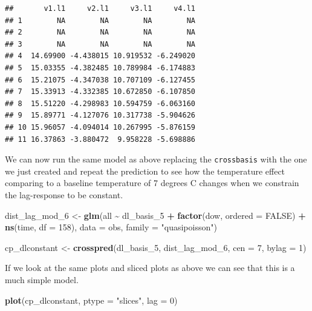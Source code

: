 \documentclass[
]{book}
\newenvironment{Shaded}{\begin{snugshade}}{\end{snugshade}}
\newcommand{\AttributeTok}[1]{\textcolor[rgb]{0.13,0.29,0.53}{#1}}
\newcommand{\ConstantTok}[1]{\textcolor[rgb]{0.56,0.35,0.01}{#1}}
\newcommand{\DecValTok}[1]{\textcolor[rgb]{0.00,0.00,0.81}{#1}}
\newcommand{\FunctionTok}[1]{\textcolor[rgb]{0.13,0.29,0.53}{\textbf{#1}}}
\newcommand{\NormalTok}[1]{#1}
\newcommand{\OtherTok}[1]{\textcolor[rgb]{0.56,0.35,0.01}{#1}}
\newcommand{\SpecialCharTok}[1]{\textcolor[rgb]{0.81,0.36,0.00}{\textbf{#1}}}
\newcommand{\StringTok}[1]{\textcolor[rgb]{0.31,0.60,0.02}{#1}}
\begin{document}
\begin{verbatim}
##       v1.l1     v2.l1     v3.l1     v4.l1
## 1        NA        NA        NA        NA
## 2        NA        NA        NA        NA
## 3        NA        NA        NA        NA
## 4  14.69900 -4.438015 10.919532 -6.249020
## 5  15.03355 -4.382485 10.789984 -6.174883
## 6  15.21075 -4.347038 10.707109 -6.127455
## 7  15.33913 -4.332385 10.672850 -6.107850
## 8  15.51220 -4.298983 10.594759 -6.063160
## 9  15.89771 -4.127076 10.317738 -5.904626
## 10 15.96057 -4.094014 10.267995 -5.876159
## 11 16.37863 -3.880472  9.958228 -5.698886
\end{verbatim}

We can now run the same model as above replacing the \texttt{crossbasis} with the one we just created and
repeat the prediction to see how the temperature effect comparing to a baseline temperature
of 7 degrees C changes when we constrain the lag-response to be constant.

\begin{Shaded}
\begin{Highlighting}[]
\NormalTok{dist\_lag\_mod\_6 }\OtherTok{\textless{}{-}} \FunctionTok{glm}\NormalTok{(all }\SpecialCharTok{\textasciitilde{}}\NormalTok{ dl\_basis\_5 }\SpecialCharTok{+} 
                        \FunctionTok{factor}\NormalTok{(dow, }\AttributeTok{ordered =} \ConstantTok{FALSE}\NormalTok{) }\SpecialCharTok{+}
                          \FunctionTok{ns}\NormalTok{(time, }\AttributeTok{df =} \DecValTok{158}\NormalTok{), }
                        \AttributeTok{data =}\NormalTok{ obs, }\AttributeTok{family =} \StringTok{"quasipoisson"}\NormalTok{)}

\NormalTok{cp\_dlconstant }\OtherTok{\textless{}{-}} \FunctionTok{crosspred}\NormalTok{(dl\_basis\_5, dist\_lag\_mod\_6, }\AttributeTok{cen =} \DecValTok{7}\NormalTok{, }\AttributeTok{bylag =} \DecValTok{1}\NormalTok{)}
\end{Highlighting}
\end{Shaded}

If we look at the same plots and sliced plots as above we can see that this is a much simple model.

\begin{Shaded}
\begin{Highlighting}[]
\FunctionTok{plot}\NormalTok{(cp\_dlconstant, }\AttributeTok{ptype =} \StringTok{"slices"}\NormalTok{, }\AttributeTok{lag =} \DecValTok{0}\NormalTok{)}
\end{Highlighting}
\end{Shaded}
\end{document}
